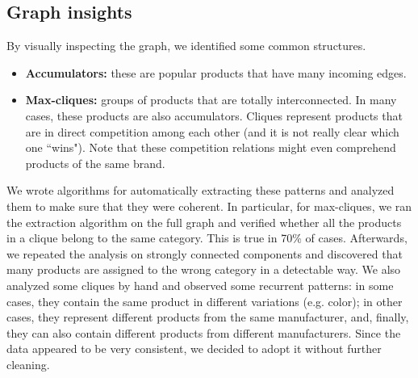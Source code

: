 \documentclass[11pt]{article}
\begin{document}
\subsection{Graph insights}
By visually inspecting the graph, we identified some common structures.
\begin{itemize}
	\item \textbf{Accumulators:} these are popular products that have many incoming edges.
	\item \textbf{Max-cliques:} groups of products that are totally interconnected. In many cases, these products are also accumulators. Cliques represent products that are in direct competition among each other (and it is not really clear which one ``wins"). Note that these competition relations might even comprehend products of the same brand.
\end{itemize}
We wrote algorithms for automatically extracting these patterns and analyzed them to make sure that they were coherent. In particular, for max-cliques, we ran the extraction algorithm on the full graph and verified whether all the products in a clique belong to the same category. This is true in 70\% of cases. Afterwards, we repeated the analysis on strongly connected components and discovered that many products are assigned to the wrong category in a detectable way. We also analyzed some cliques by hand and observed some recurrent patterns: in some cases, they contain the same product in different variations (e.g. color); in other cases, they represent different products from the same manufacturer, and, finally, they can also contain different products from different manufacturers. Since the data appeared to be very consistent, we decided to adopt it without further cleaning.
\end{document}
